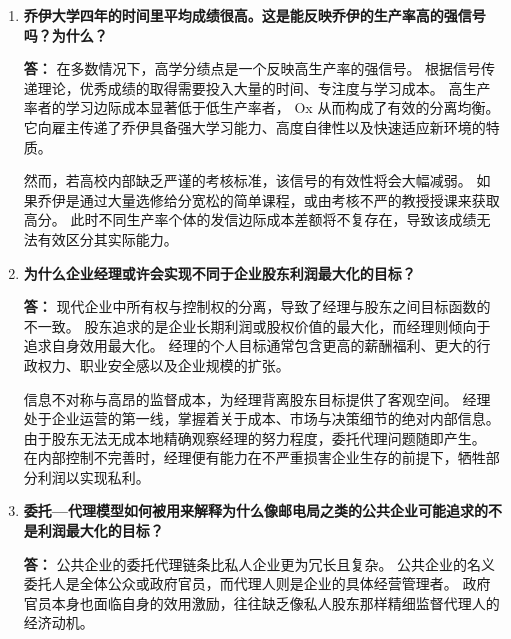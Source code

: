 \begin{enumerate}[label=\textbf{\arabic*.}, leftmargin=*]
		\textbf{答：} 在信息不对称的柠檬市场中，若无信号传递，高质量产品将被低质量产品通过价格战驱逐。
		高质量卖方为了打破这一低价低质的逆向选择僵局，必须主动发出可信信号以实现分离均衡。
		通过成功传递信号，卖方得以向买方证明产品价值，从而获取溢价回报并扩大市场份额。
		质量保证和保修单能够成为有效的市场信号，核心在于其满足了单重合同约束的成本差异机制。
		
		低质量产品的故障率高，若提供同等力度的保修，其后期的维修与赔偿开支将呈几何级数上升。
		高质量产品由于工艺精湛，提供长期保修的边际成本极低，因而低质量企业绝无动力进行盲目效仿。
		理性消费者能够准确识别这种成本差异，从而将保修单视为高品质的可靠背书并愿意为此支付高价。
		
		\item \textbf{乔伊大学四年的时间里平均成绩很高。这是能反映乔伊的生产率高的强信号吗？为什么？}
		
		\textbf{答：} 在多数情况下，高学分绩点是一个反映高生产率的强信号。
		根据信号传递理论，优秀成绩的取得需要投入大量的时间、专注度与学习成本。
		高生产率者的学习边际成本显著低于低生产率者， Ox 从而构成了有效的分离均衡。
		它向雇主传递了乔伊具备强大学习能力、高度自律性以及快速适应新环境的特质。
		
		然而，若高校内部缺乏严谨的考核标准，该信号的有效性将会大幅减弱。
		如果乔伊是通过大量选修给分宽松的简单课程，或由考核不严的教授授课来获取高分。
		此时不同生产率个体的发信边际成本差额将不复存在，导致该成绩无法有效区分其实际能力。
		
		\item \textbf{为什么企业经理或许会实现不同于企业股东利润最大化的目标？}
		
		\textbf{答：} 现代企业中所有权与控制权的分离，导致了经理与股东之间目标函数的不一致。
		股东追求的是企业长期利润或股权价值的最大化，而经理则倾向于追求自身效用最大化。
		经理的个人目标通常包含更高的薪酬福利、更大的行政权力、职业安全感以及企业规模的扩张。
		
		信息不对称与高昂的监督成本，为经理背离股东目标提供了客观空间。
		经理处于企业运营的第一线，掌握着关于成本、市场与决策细节的绝对内部信息。
		由于股东无法无成本地精确观察经理的努力程度，委托代理问题随即产生。
		在内部控制不完善时，经理便有能力在不严重损害企业生存的前提下，牺牲部分利润以实现私利。
		
		\item \textbf{委托—代理模型如何被用来解释为什么像邮电局之类的公共企业可能追求的不是利润最大化的目标？}
		
		\textbf{答：} 公共企业的委托代理链条比私人企业更为冗长且复杂。
		公共企业的名义委托人是全体公众或政府官员，而代理人则是企业的具体经营管理者。
		政府官员本身也面临自身的效用激励，往往缺乏像私人股东那样精细监督代理人的经济动机。
		

\end{enumerate}
